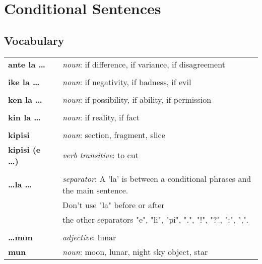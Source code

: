 \section{Conditional Sentences}
%
\subsection*{Vocabulary}
%
\begin{supertabular}{p{2,5cm}|ll}
%
\textbf{ante la \dots} && \textit{noun}: if difference, if variance, if disagreement  \\ %
 && \\ %
%
\textbf{ike la \dots} && \textit{noun}: if negativity, if badness, if evil \\ %
 && \\ %
%
\textbf{ken la \dots} && \textit{noun}: if possibility, if ability, if permission \\ %
 && \\ %
%
\textbf{kin la \dots} && \textit{noun}: if reality, if fact \\  %
 && \\ %
%
\textbf{kipisi} && \textit{noun}: section, fragment, slice \\ %
\textbf{kipisi (e \dots)} && \textit{verb transitive}: to cut \\ %
 && \\ %
%
\textbf{\dots la \dots} && \textit{separator}: A 'la' is between a conditional phrases and the main sentence. \\ &&  Don't use "la" before or after \\ && the other separators "e", "li", "pi", ".", "!", "?", ":", ",".  \\ %
 && \\ %
%
\textbf{\dots mun} && \textit{adjective}: lunar \\ %
\textbf{mun} && \textit{noun}: moon, lunar, night sky object, star \\ %

\end{supertabular}
